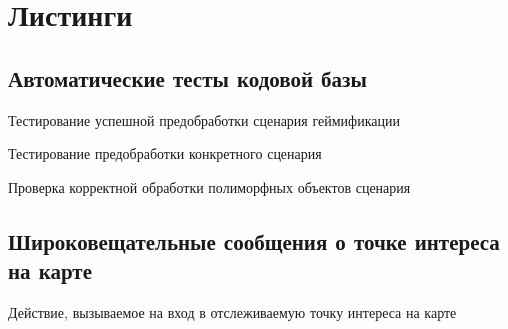 \chapter{Листинги}

\section{Автоматические тесты кодовой базы}
\label{list_sec:autotests}
\begin{ListingEnv}
	\caption{Тестирование успешной предобработки сценария геймификации}
	\UseRawInputEncoding
	\footnotesize
	
	\label{list:scenario_parse_test}
\end{ListingEnv}

\begin{ListingEnv}
	\caption{Тестирование предобработки конкретного сценария}
	\UseRawInputEncoding
	\footnotesize
	
	\label{list:scenario_mmcs_test}
\end{ListingEnv}

\begin{ListingEnv}
	\caption{Проверка корректной обработки полиморфных объектов сценария}
	\UseRawInputEncoding
	\footnotesize
	
	\label{list:scenario_poly_test}
\end{ListingEnv}

\section{Широковещательные сообщения о точке интереса на карте}
\label{list_sec:broadcasting}
\begin{ListingEnv}
	\caption{Действие, вызываемое на вход в отслеживаемую точку интереса на карте}
	\UseRawInputEncoding
	\footnotesize
	
	\label{list:geofence_brr_on_entered}
\end{ListingEnv}

